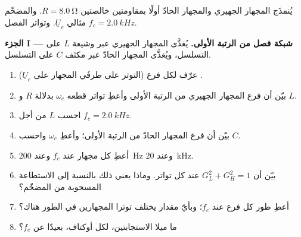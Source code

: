 \begin{problem}
\label{pb:b1:filters-transfer-functions:1}
يُنمذَج المجهار الجهيري والمجهار الحادّ أولًا بمقاومتين خالصتين
$R = \qty{8.0}{\ohm}$. والمضخّم  مثالي
$\underline U_e$. وتواتر الفصل $f_c = \qty{2.0}{kHz}$.

\medskip
\noindent\textbf{الجزء I --- شبكة فصل من الرتبة الأولى.}
يُغذَّى المجهار الجهيري عبر وشيعة $L$ على التسلسل، ويُغذَّى المجهار الحادّ عبر
مكثف $C$ على التسلسل.
\begin{enumerate}
  \item عرّف  لكل فرع (التوتر على طرفَي
        المجهار على $\underline U_e$)  .
  \item بيّن أن فرع المجهار الجهيري  من الرتبة الأولى وأعطِ
        تواتر قطعه $\omega_c$ بدلالة $R$ و $L$.
  \item احسب $L$ من أجل $f_c = \qty{2.0}{kHz}$.
  \item بيّن أن فرع المجهار الحادّ  من الرتبة الأولى؛ وأعطِ
        $\omega_c$ واحسب $C$.
  \item أعطِ  كل مجهار  عند $f_c$ وعند \qty{200}{Hz}
        وعند \qty{20}{kHz}.
  \item بيّن أن $G_L^2 + G_H^2 = 1$ عند كل تواتر. وماذا يعني
        ذلك بالنسبة إلى الاستطاعة المسحوبة من المضخّم؟
  \item أعطِ طور كل فرع عند $f_c$؛ وبأيّ مقدار يختلف توترا
        المجهارين في الطور هناك؟
  \item ما ميلا الاستجابتين،  لكل أوكتاف، بعيدًا
        عن $f_c$؟
\end{enumerate}


\end{problem}
